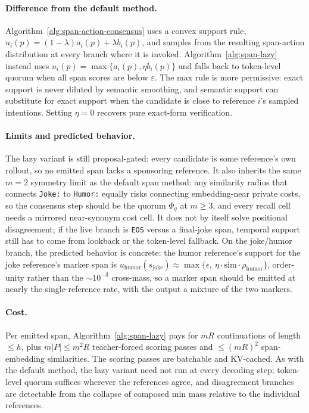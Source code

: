 \documentclass[11pt]{article}
\begin{document}
\paragraph{Difference from the default method.} Algorithm~\ref{alg:span-action-consensus} uses a convex support rule, $u_i(p)=(1-\lambda)a_i(p)+\lambda b_i(p)$, and samples from the resulting span-action distribution at every branch where it is invoked. Algorithm~\ref{alg:span-lazy} instead uses $u_i(p)=\max\{a_i(p),\eta b_i(p)\}$ and falls back to token-level quorum when all span scores are below $\varepsilon$. The max rule is more permissive: exact support is never diluted by semantic smoothing, and semantic support can substitute for exact support when the candidate is close to reference $i$'s sampled intentions. Setting $\eta=0$ recovers pure exact-form verification.

\paragraph{Limits and predicted behavior.} The lazy variant is still proposal-gated: every candidate is some reference's own rollout, so no emitted span lacks a sponsoring reference. It also inherits the same $m=2$ symmetry limit as the default span method: any similarity radius that connects \texttt{Joke:} to \texttt{Humor:} equally risks connecting embedding-near private costs, so the consensus step should be the quorum $\Phi_q$ at $m\ge3$, and every recall cell needs a mirrored near-synonym cost cell. It does not by itself solve positional disagreement; if the live branch is \texttt{EOS} versus a final-joke span, temporal support still has to come from lookback or the token-level fallback. On the joke/humor branch, the predicted behavior is concrete: the humor reference's support for the joke reference's marker span is $u_{\mathrm{humor}}(s_{\mathrm{joke}})\approx\max\{\epsilon,\ \eta\cdot\mathrm{sim}\cdot\rho_{\mathrm{humor}}\}$, order-unity rather than the $\sim10^{-3}$ cross-mass, so a marker span should be emitted at nearly the single-reference rate, with the output a mixture of the two markers.

\paragraph{Cost.} Per emitted span, Algorithm~\ref{alg:span-lazy} pays for $mR$ continuations of length $\le h$, plus $m|P|\le m^2R$ teacher-forced scoring passes and $\le(mR)^2$ span-embedding similarities. The scoring passes are batchable and KV-cached. As with the default method, the lazy variant need not run at every decoding step; token-level quorum suffices wherever the references agree, and disagreement branches are detectable from the collapse of composed min mass relative to the individual references.
\end{document}
